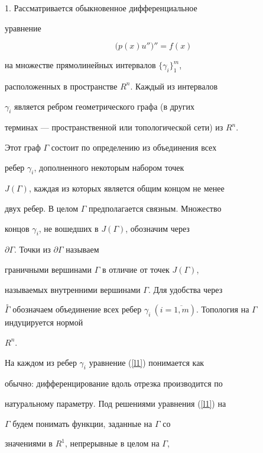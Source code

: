 \label{begin}





1. Рассматривается обыкновенное дифференциальное


уравнение


\begin{equation}


\label{l1}


\bigl(p(x)u''\bigr)''=f(x)


\end{equation}


на множестве прямолинейных интервалов $\{\gamma_i\}_1^m$,


расположенных в пространстве $R^n$. Каждый из интервалов


$\gamma_i$ является ребром геометрического графа (в других


терминах --- пространственной или топологической сети) из $R^n$.


Этот граф $\Gamma$ состоит по определению из объединения всех


ребер $\gamma_i$, дополненного некоторым набором точек


$J(\Gamma)$, каждая из которых является общим концом не менее


двух ребер. В целом $\Gamma$ предполагается связным. Множество


концов $\gamma_i$, не вошедших в $J(\Gamma)$, обозначим через


$\partial \Gamma$. Точки из $\partial \Gamma$ называем


граничными вершинами $\Gamma$ в отличие от точек $J(\Gamma)$,


называемых внутренними вершинами $\Gamma$. Для удобства через


$\overset{\circ}{\Gamma}$ обозначаем объединение всех ребер $\gamma_i\


(i=\overline{1,m})$. Топология на $\Gamma$ индуцируется нормой


$R^n$.





На каждом из ребер $\gamma_i$ уравнение (\ref{l1}) понимается как


обычно: дифференцирование вдоль отрезка производится по


натуральному параметру. Под решениями уравнения (\ref{l1}) на


$\Gamma$ будем понимать функции, заданные на $\Gamma$ со


значениями в $R^1$, непрерывные в целом на $\Gamma$,


